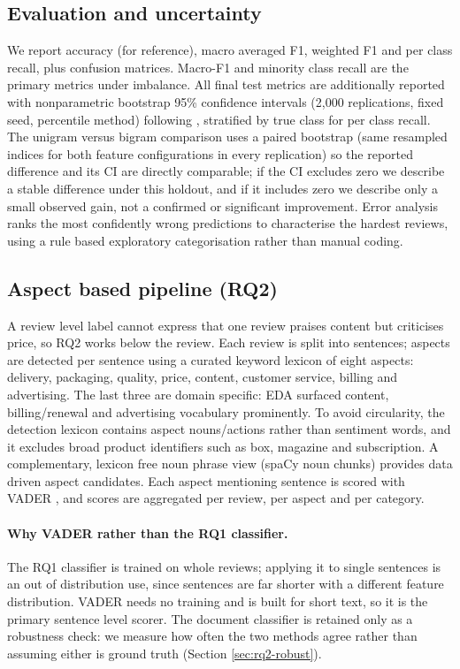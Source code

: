 \documentclass[11pt,a4paper,DIV=12]{scrartcl}
\begin{document}
\subsection{Evaluation and uncertainty}
We report accuracy (for reference), macro averaged F1, weighted F1 and per class
recall, plus confusion matrices. Macro-F1 and minority class recall are the
primary metrics under imbalance. All final test metrics are additionally
reported with nonparametric bootstrap 95\% confidence intervals (2,000
replications, fixed seed, percentile method) following \citet{efron1993bootstrap},
stratified by true class for per class recall. The unigram versus bigram comparison
uses a paired bootstrap (same resampled indices for both feature
configurations in every replication) so the reported difference and its CI are
directly comparable; if the CI excludes zero we describe a stable difference
under this holdout, and if it includes zero we describe only a small observed
gain, not a confirmed or significant improvement. Error analysis ranks the most
confidently wrong predictions to characterise the hardest reviews, using a
rule based exploratory categorisation rather than manual coding.

\subsection{Aspect based pipeline (RQ2)}
\label{sec:method-rq2}
A review level label cannot express that one review praises content but
criticises price, so RQ2 works below the review. Each review is split into
sentences; aspects are detected per sentence using a curated keyword lexicon of
eight aspects: delivery, packaging, quality, price, content, customer
service, billing and advertising. The last three are domain specific:
EDA surfaced content, billing/renewal and advertising vocabulary prominently.
To avoid circularity, the detection lexicon contains aspect nouns/actions rather
than sentiment words, and it excludes broad product identifiers such as
box, magazine and subscription. A complementary, lexicon free
noun phrase view (spaCy noun chunks) provides data driven aspect candidates.
Each aspect mentioning sentence is scored with VADER \citep{hutto2014vader}, and
scores are aggregated per review, per aspect and per category.

\paragraph{Why VADER rather than the RQ1 classifier.}
The RQ1 classifier is trained on whole reviews; applying it to single sentences
is an out of distribution use, since sentences are far shorter with a different
feature distribution. VADER needs no training and is built for short text, so it
is the primary sentence level scorer. The document classifier is retained
only as a robustness check: we measure how often the two methods agree
rather than assuming either is ground truth (Section \ref{sec:rq2-robust}).
\end{document}
